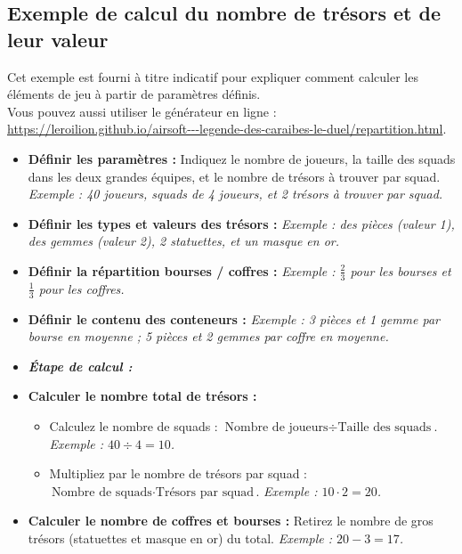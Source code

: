 \documentclass{pirategame}
\begin{document}
\subsection{Exemple de calcul du nombre de trésors et de leur valeur}

Cet exemple est fourni à titre indicatif pour expliquer comment calculer les éléments de jeu à partir de paramètres définis.\\ 
Vous pouvez aussi utiliser le générateur en ligne : \url{https://leroilion.github.io/airsoft---legende-des-caraibes-le-duel/repartition.html}.

\begin{itemize}
  \item \textbf{Définir les paramètres :} Indiquez le nombre de joueurs, la taille des squads dans les deux grandes équipes, et le nombre de trésors à trouver par squad.  
  \textit{Exemple : 40 joueurs, squads de 4 joueurs, et 2 trésors à trouver par squad.}

  \item \textbf{Définir les types et valeurs des trésors :}  
  \textit{Exemple : des pièces (valeur 1), des gemmes (valeur 2), 2 statuettes, et un masque en or.}

  \item \textbf{Définir la répartition bourses / coffres :}  
  \textit{Exemple : \(\frac{2}{3}\) pour les bourses et \(\frac{1}{3}\) pour les coffres.}

  \item \textbf{Définir le contenu des conteneurs :}  
  \textit{Exemple : 3 pièces et 1 gemme par bourse en moyenne ; 5 pièces et 2 gemmes par coffre en moyenne.}

  \item \textbf{\textit{Étape de calcul :}}

  \item \textbf{Calculer le nombre total de trésors :}
  \begin{itemize}
    \item Calculez le nombre de squads : \(\text{Nombre de joueurs} \div \text{Taille des squads}\).  
    \textit{Exemple : \(40 \div 4 = 10\).}
    \item Multipliez par le nombre de trésors par squad : \(\text{Nombre de squads} \cdot \text{Trésors par squad}\).  
    \textit{Exemple : \(10 \cdot 2 = 20\).}
  \end{itemize}

  \item \textbf{Calculer le nombre de coffres et bourses :}  
  Retirez le nombre de gros trésors (statuettes et masque en or) du total.  
  \textit{Exemple : \(20 - 3 = 17\).}


\end{itemize}
\end{document}
